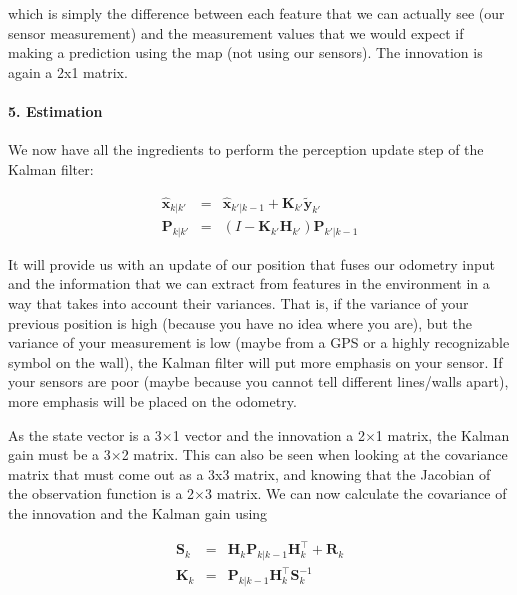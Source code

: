 which is simply the difference between each feature that we can actually see (our sensor measurement) and the measurement values that we would expect if making a prediction using the map (not using our sensors). The innovation is again a 2x1 matrix.

\paragraph{5. Estimation}
We now have all the ingredients to perform the perception update step of the Kalman filter:

\begin{eqnarray}
\hat{\boldsymbol{x}}_{k|k'} &=& \hat{\boldsymbol{x}}_{k'|k-1} + \boldsymbol{K}_{k'}\tilde{\boldsymbol{y}}_{k'}\\
\boldsymbol{P}_{k|k'} &=& (I - \boldsymbol{K}_{k'} {\boldsymbol{H}_{k'}}) \boldsymbol{P}_{k'|k-1}
\end{eqnarray}

It will provide us with an update of our position that fuses our odometry input and the information that we can extract from features in the environment in a way that takes into account their variances. That is, if the variance of your previous position is high (because you have no idea where you are), but the variance of your measurement is low (maybe from a GPS or a highly recognizable symbol on the wall), the Kalman filter will put more emphasis on your sensor. If your sensors are poor (maybe because you cannot tell different lines/walls apart), more emphasis will be placed on the odometry.

As the state vector is a 3$\times$1 vector and the innovation a 2$\times$1 matrix, the Kalman gain must be a 3$\times$2 matrix. This can also be seen when looking at the covariance matrix that must come out as a 3x3 matrix, and knowing that the Jacobian of the observation function is a 2$\times$3 matrix. We can now calculate the covariance of the innovation and the Kalman gain using

\begin{eqnarray}
\boldsymbol{S}_{k}&=&{\boldsymbol{H}_{k}}\boldsymbol{P}_{k|k-1}{\boldsymbol{H}_{k}^\top}+\boldsymbol{R}_{k}\\
\boldsymbol{K}_{k}&=&\boldsymbol{P}_{k|k-1}{\boldsymbol{H}_{k}^\top}\boldsymbol{S}_{k}^{-1}
\end{eqnarray}

